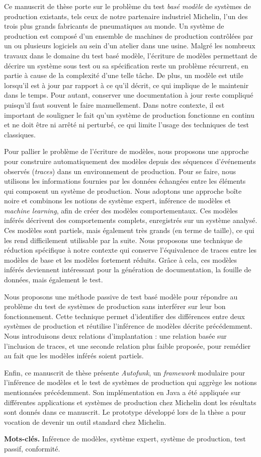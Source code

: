 Ce manuscrit de thèse porte sur le problème du test \emph{basé
modèle} de systèmes de production existants, tels ceux de notre
partenaire industriel Michelin, l'un des trois plus grands
fabricants de pneumatiques au monde. Un système de production est
composé d'un ensemble de machines de production contrôlées par un
ou plusieurs logiciels au sein d'un atelier dans une usine.
Malgré les nombreux travaux dans le domaine du test basé modèle,
l'écriture de modèles permettant de décrire un système sous test
ou sa spécification reste un problème récurrent, en partie à cause
de la complexité d'une telle tâche. De plus, un modèle est utile
lorsqu'il est à jour par rapport à ce qu'il décrit, ce qui
implique de le maintenir dans le temps. Pour autant, conserver
une documentation à jour reste compliqué puisqu'il faut souvent
le faire manuellement. Dans notre contexte, il est important de
souligner le fait qu'un système de production fonctionne en
continu et ne doit être ni arrêté ni perturbé, ce qui limite
l'usage des techniques de test classiques.

Pour pallier le problème de l'écriture de modèles, nous proposons
une approche pour construire automatiquement des modèles depuis
des séquences d'événements observés (\emph{traces}) dans un
environnement de production. Pour se faire, nous utilisons les
informations fournies par les données échangées entre les
éléments qui composent un système de production. Nous adoptons
une approche boîte noire et combinons les notions de système
expert, inférence de modèles et \emph{machine learning}, afin de
créer des modèles comportementaux. Ces modèles inférés décrivent
des comportements complets, enregistrés sur un système
analysé. Ces modèles
sont partiels, mais également très grands (en terme de taille),
ce qui les rend difficilement utilisable par la suite. Nous
proposons une technique de réduction spécifique à notre contexte
qui conserve l'équivalence de traces entre les modèles de base et
les modèles fortement réduits. Grâce à cela, ces modèles inférés
deviennent intéressant pour la génération de documentation, la
fouille de données, mais également le test.

Nous proposons une méthode passive de test basé modèle pour
répondre au problème du test de systèmes de production sans
interférer sur leur bon fonctionnement. Cette technique permet
d'identifier des différences entre deux systèmes de production et
réutilise l'inférence de modèles décrite précédemment. Nous
introduisons deux relations d'implantation : une relation basée
sur l'inclusion de traces, et une seconde relation plus faible
proposée, pour remédier au fait que les modèles inférés soient
partiels.

Enfin, ce manuscrit de thèse présente \emph{Autofunk}, un
\emph{framework} modulaire pour l'inférence de modèles et le test
de systèmes de production qui aggrège les notions mentionnées
précédemment. Son implémentation en Java a été appliquée sur
différentes applications et systèmes de production chez Michelin
dont les résultats sont donnés dans ce manuscrit. Le prototype
développé lors de la thèse a pour vocation de devenir un outil
standard chez Michelin.

\textbf{Mots-clés.} Inférence de modèles, système expert, système
de production, test passif, conformité.
